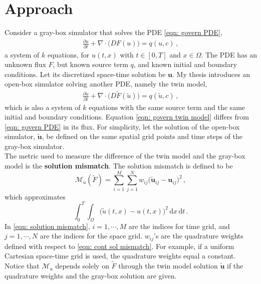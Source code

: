 \section{Approach}
\label{infer}
Consider a gray-box simulator that solves the PDE \eqref{eqn: govern PDE}, 
\begin{equation*}\begin{split}
    \frac{\partial u}{\partial t}+ \nabla \cdot \big( D F(u) \big) = q(u,c)\,,
\end{split}
\end{equation*}
a system of $k$ equations, for $u(t,x)$ with $t\in[0,T]$
and $x\in\Omega$. The PDE has an unknown flux $F$, but known source term $q$, and
known initial and boundary conditions.
Let its discretized space-time solution be $\boldsymbol{u}$.
My thesis introduces an open-box simulator solving another PDE, namely the twin model,
\begin{equation}\begin{split}
    \frac{\partial \tilde{u}}{\partial t}+ \nabla \cdot \big(D \tilde{F}(\tilde{u})\big) = q(\tilde{u},c)\,,
\end{split}
\label{eqn: govern twin model}
\end{equation}
which is also a system of $k$ equations
with the same source term and the same initial and boundary conditions. 
Equation \eqref{eqn: govern twin model}
differs from \eqref{eqn: govern PDE} in its flux. 
For simplicity,
let the solution of the open-box simulator, $\tilde{\boldsymbol{u}}$, be defined on the same 
spatial grid points and time steps of the gray-box simulator. \\

The metric used to measure the difference of the twin model and the gray-box model is the
\textbf{solution mismatch}.
The solution mismatch is defined to be
\begin{equation}
    \mathcal{M}_u(\tilde{F}) = \sum_{i=1}^M \sum_{j=1}^N w_{ij} \big( \tilde{\boldsymbol{u}}_{ij}
     -\boldsymbol{u}_{ij}\big)^2 \,,
    \label{eqn: solution mismatch}
\end{equation}
which approximates
\begin{equation}
    \int_{0}^T\int_\Omega \big(\tilde{u}(t,x) - u(t,x)\big)^2 \, \textrm{d}x\,\textrm{d}t\,.
    \label{eqn: cont sol mismatch}
\end{equation}
In \eqref{eqn: solution mismatch}, $i=1,\cdots, M$ are the indices for time grid, and $j=1,\cdots, N$ are the indices for the space grid.
$w_{ij}$'s are the quadrature weights defined with respect to \eqref{eqn: cont sol mismatch}. 
For example, if a uniform Cartesian space-time grid is used, the quadrature weights equal a constant.
Notice that $\mathcal{M}_u$ depends solely on
$\tilde{F}$ through the twin model solution $\tilde{\boldsymbol{u}}$ if the 
quadrature weights and the gray-box solution are given.\\


